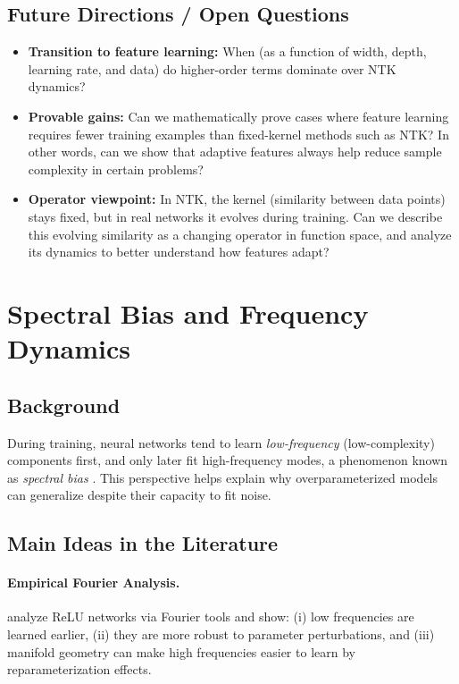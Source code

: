 \documentclass[11pt]{article}
\begin{document}
\subsection{Future Directions / Open Questions}
\begin{itemize}
	\item \textbf{Transition to feature learning:} When (as a function of width, depth, learning rate, and data) do higher-order terms dominate over NTK dynamics?
	\item \textbf{Provable gains:} Can we mathematically prove cases where feature learning requires fewer training examples than fixed-kernel methods such as NTK? In other words, can we show that adaptive features always help reduce sample complexity in certain problems?
	\item \textbf{Operator viewpoint:} In NTK, the kernel (similarity between data points) stays fixed, but in real networks it evolves during training. Can we describe this evolving similarity as a changing operator in function space, and analyze its dynamics to better understand how features adapt?
\end{itemize}

\section{Spectral Bias and Frequency Dynamics}
\subsection{Background}
During training, neural networks tend to learn \emph{low-frequency} (low-complexity) components first, and only later fit
high-frequency modes, a phenomenon known as \emph{spectral bias} \citep{rahaman2019spectral}. This perspective
helps explain why overparameterized models can generalize despite their capacity to fit noise.

\subsection{Main Ideas in the Literature}
\paragraph{Empirical Fourier Analysis.}
\citet{rahaman2019spectral} analyze ReLU networks via Fourier tools and show: (i) low frequencies are learned earlier, (ii) they are more robust to parameter perturbations,
and (iii) manifold geometry can make high frequencies easier to learn by reparameterization effects.
\end{document}
